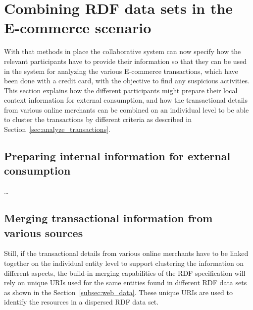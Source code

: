 
\section{Combining \gls{RDF} data sets in the \gls{E-commerce} scenario}
\label{sec:working_semantic_data}

With that methods in place the collaborative system can now specify how the relevant participants have to provide their information so that they can be used in the system for analyzing the various \gls{E-commerce} transactions, which have been done with a credit card, with the objective to find any suspicious activities. This section explains how the different participants might prepare their local context information for external consumption, and how the transactional details from various online merchants can be combined on an individual level to be able to cluster the transactions by different criteria as described in Section~\ref{sec:analyze_transactions}.

\subsection{Preparing internal information for external consumption}
\label{subsec:prepare_information}

\ldots

\subsection{Merging transactional information from various sources}
\label{subsec:information_mapping}

Still, if the transactional details from various online merchants have to be linked together on the individual entity level to support clustering the information on different aspects, the build-in merging capabilities of the \gls{RDF} specification will rely on unique \gls{URI}s used for the same entities found in different \gls{RDF} data sets as shown in the Section~\ref{subsec:web_data}. These unique \gls{URI}s are used to identify the resources in a dispersed \gls{RDF} data set. \@

